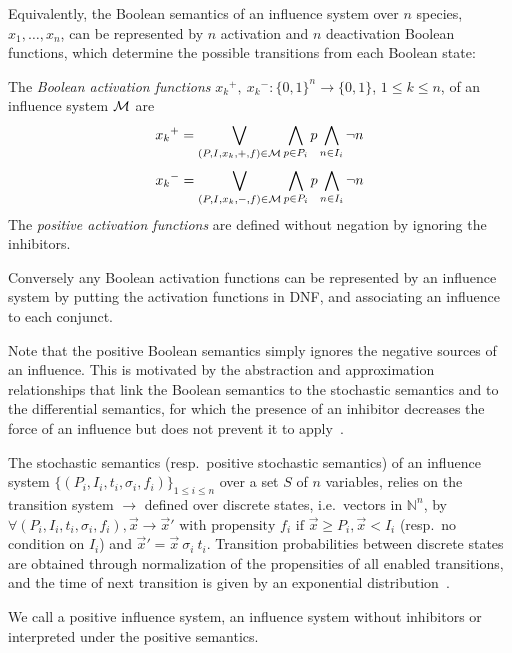 \documentclass{llncs}
\newcommand{\lra}{\longrightarrow}
\begin{document}
Equivalently, the Boolean semantics of an influence system over $n$ species, $x_1,\ldots,x_n$,
can be represented by $n$ activation and $n$ deactivation Boolean functions, 
 which determine the possible transitions from each Boolean state:

\begin{definition}\label{def:activation}
The \emph{Boolean activation functions} ${x_k}^+,\ {x_k}^-:{\{0,1\}}^n \rightarrow\{0,1\}$, $1 \leq k \leq n$,
of an influence system $\cal M$ are
$${x_k}^+=\bigvee_{(P,I,x_k,+,f)\in\cal M} \bigwedge_{p\in P_i} p\bigwedge_{n\in I_i} \neg n$$
$${x_k}^-=\bigvee_{(P,I,x_k,-,f)\in\cal M} \bigwedge_{p\in P_i} p\bigwedge_{n\in I_i} \neg n$$
The \emph{positive activation functions} are defined without negation by ignoring the inhibitors.
\end{definition}

Conversely any Boolean activation functions can be represented by an influence system
by putting the activation functions in DNF, and associating an influence to each conjunct.

Note that the positive Boolean semantics simply ignores the negative sources of an influence.
This is motivated by the abstraction and approximation relationships that link the Boolean semantics
to the stochastic semantics and to the differential semantics, for which the presence of an inhibitor decreases the force of an influence but does not prevent it to apply~\cite{FMRS16cmsb}.


\begin{definition}\label{def:stoch}
   The stochastic semantics (resp.~positive stochastic semantics) of an influence system $\{(P_i, I_i, t_i,
   \sigma_i, f_i)\}_{1\leq i\leq n}$ over a set $S$ of $n$ variables, relies
   on the transition system $\lra$ defined over discrete states, i.e.\
   vectors in $\mathbb{N}^n$, by $\forall (P_i, I_i, t_i, \sigma_i, f_i), {\vec
   x}\lra{\vec x'} \text{ with propensity }f_i\text{ if }{\vec x}\geq P_i,
   {\vec x}<I_i$ (resp.~no condition on $I_i$) and ${\vec x'} = {\vec x}\  \sigma_i\ t_i$.
   Transition probabilities between discrete states are obtained through
   normalization of the propensities of all enabled transitions, and the time
   of next transition is given by an exponential distribution~\cite{Gillespie77jpc}.
\end{definition}

We call a positive influence system, an influence system without inhibitors or interpreted under the positive semantics.
\end{document}
